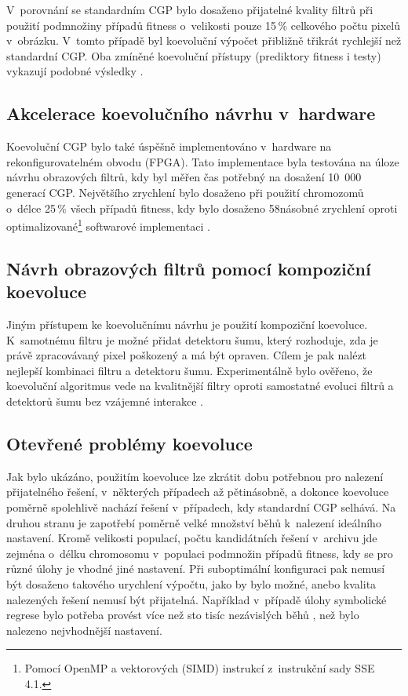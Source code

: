 V~porovnání se standardním CGP bylo dosaženo přijatelné kvality filtrů při použití podmnožiny případů fitness o~velikosti pouze 15\,\% celkového počtu pixelů v~obrázku. V~tomto případě byl koevoluční výpočet přibližně třikrát rychlejší než standardní CGP. Oba zmíněné koevoluční přístupy (prediktory fitness i testy) vykazují podobné výsledky \cite{SikuPPSN}.

\subsection{Akcelerace koevolučního návrhu v~hardware}

Koevoluční CGP bylo také úspěšně implementováno v~hardware na rekonfigurovatelném obvodu (FPGA). Tato implementace byla testována na úloze návrhu obrazových filtrů, kdy byl měřen čas potřebný na dosažení 10~000 generací CGP. Největšího zrychlení bylo dosaženo při použití chromozomů o~délce 25\,\% všech případů fitness, kdy bylo dosaženo 58násobné zrychlení oproti optimalizované\footnote{Pomocí OpenMP a vektorových (SIMD) instrukcí z~instrukční sady SSE 4.1.} softwarové implementaci \cite{Hrbacek}.

\subsection{Návrh obrazových filtrů pomocí kompoziční koevoluce}

Jiným přístupem ke koevolučnímu návrhu je použití kompoziční koevoluce. K~samotnému filtru je možné přidat detektoru šumu, který rozhoduje, zda je právě zpracovávaný pixel poškozený a má být opraven. Cílem je pak nalézt nejlepší kombinaci filtru a detektoru šumu. Experimentálně bylo ověřeno, že koevoluční algoritmus vede na kvalitnější filtry oproti samostatné evoluci filtrů a detektorů šumu bez vzájemné interakce \cite{SikuKomjathy}.

\subsection{Otevřené problémy koevoluce}

Jak bylo ukázáno, použitím koevoluce lze zkrátit dobu potřebnou pro nalezení přijatelného řešení, v~některých případech až pětinásobně, a dokonce koevoluce poměrně spolehlivě nachází řešení v~případech, kdy standardní CGP selhává. Na druhou stranu je zapotřebí poměrně velké množství běhů k~nalezení ideálního nastavení. Kromě velikosti populací, počtu kandidátních řešení v~archivu jde zejména o~délku chromosomu v~populaci podmnožin případů fitness, kdy se pro různé úlohy je vhodné jiné nastavení. Při suboptimální konfiguraci pak nemusí být dosaženo takového urychlení výpočtu, jako by bylo možné, anebo kvalita nalezených řešení nemusí být přijatelná. Například v~případě úlohy symbolické regrese bylo potřeba provést více než sto tisíc nezávislých běhů \cite{SikuEuroGP}, než bylo nalezeno nejvhodnější nastavení.

